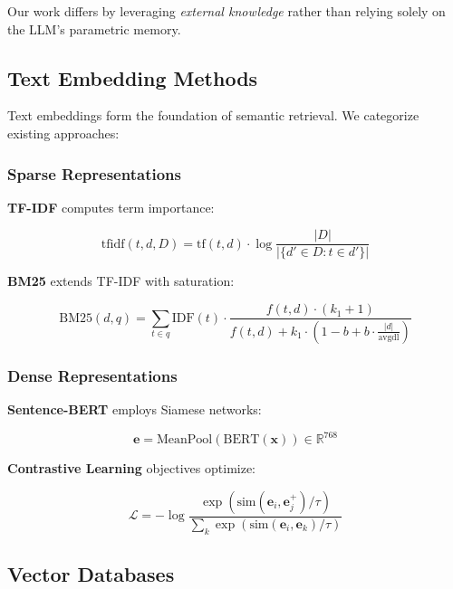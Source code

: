 \documentclass[11pt,a4paper]{article}
\newcommand{\simfunc}{\text{sim}}
\begin{document}
Our work differs by leveraging \textit{external knowledge} rather than relying solely on the LLM's parametric memory.

\subsection{Text Embedding Methods}

Text embeddings form the foundation of semantic retrieval. We categorize existing approaches:

\subsubsection{Sparse Representations}

\textbf{TF-IDF} \cite{salton1988tfidf} computes term importance:

\begin{equation}
\text{tfidf}(t,d,D) = \text{tf}(t,d) \cdot \log\frac{|D|}{|\{d' \in D : t \in d'\}|}
\end{equation}

\textbf{BM25} \cite{robertson2009bm25} extends TF-IDF with saturation:

\begin{equation}
\text{BM25}(d,q) = \sum_{t \in q} \text{IDF}(t) \cdot \frac{f(t,d) \cdot (k_1 + 1)}{f(t,d) + k_1 \cdot (1 - b + b \cdot \frac{|d|}{\text{avgdl}})}
\end{equation}

\subsubsection{Dense Representations}

\textbf{Sentence-BERT} \cite{reimers2019sbert} employs Siamese networks:

\begin{equation}
\mathbf{e} = \text{MeanPool}(\text{BERT}(\mathbf{x})) \in \mathbb{R}^{768}
\end{equation}

\textbf{Contrastive Learning} objectives optimize:

\begin{equation}
\mathcal{L} = -\log \frac{\exp(\simfunc(\mathbf{e}_i, \mathbf{e}_j^+)/\tau)}{\sum_{k}\exp(\simfunc(\mathbf{e}_i, \mathbf{e}_k)/\tau)}
\end{equation}

\subsection{Vector Databases}
\end{document}
